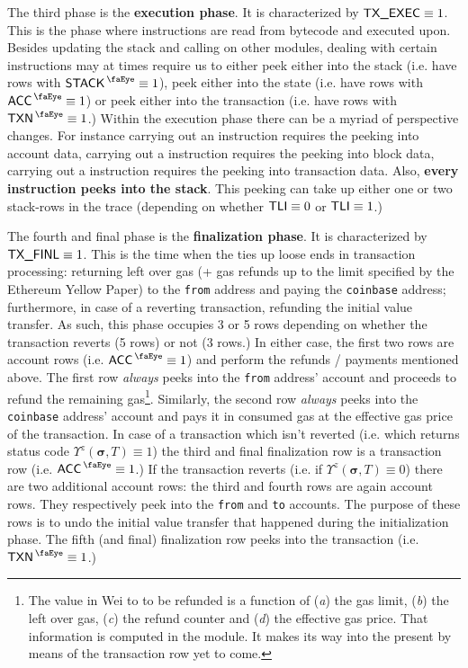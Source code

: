 The third phase is the \textbf{execution phase}.
It is characterized by $\textsf{TX}\textsf{\_EXEC} \equiv 1$. This is the phase where instructions are read from bytecode and executed upon. Besides updating the stack and calling on other modules, dealing with certain instructions may at times require us to either
peek either into the stack       (i.e. have rows with $\peekStack \equiv 1$),
peek either into the state       (i.e. have rows with $\peekAccount \equiv 1$) or
peek either into the transaction (i.e. have rows with $\peekTransaction \equiv 1$.)
Within the execution phase there can be a myriad of perspective changes.
For instance
carrying out an  instruction requires the \zkEvm{} peeking into account data,
carrying out a        instruction requires the \zkEvm{} peeking into block data,
carrying out a        instruction requires the \zkEvm{} peeking into transaction data.
Also, \textbf{every instruction peeks into the stack}.
This peeking can take up either one or two stack-rows in the trace (depending on whether $\textsf{TLI} \equiv 0$ or $\textsf{TLI} \equiv 1$.)

The fourth and final phase is the \textbf{finalization phase}.
It is characterized by $\textsf{TX}\textsf{\_FINL} \equiv 1$. This is the time when the \zkEvm{} ties up loose ends in transaction processing: returning left over gas (+ gas refunds up to the limit specified by the Ethereum Yellow Paper) to the \texttt{from} address and paying the \texttt{coinbase} address; furthermore, in case of a reverting transaction, refunding the initial value transfer. As such, this phase occupies 3 or 5 rows depending on whether the transaction reverts (5 rows) or not (3 rows.) In either case, the first two rows are account rows (i.e. $\peekAccount \equiv 1$) and perform the refunds / payments mentioned above. The first row \emph{always} peeks into the \texttt{from} address' account and proceeds to refund the remaining gas\footnote{The value in Wei to to be refunded is a function of
(\emph{a}) the gas limit,
(\emph{b}) the left over gas,
(\emph{c}) the refund counter and 
(\emph{d}) the effective gas price.
That information is computed in the \txnDataMod{} module. It makes its way into the present \hubMod{} by means of the transaction row yet to come.}. Similarly, the second row \emph{always} peeks into the \texttt{coinbase} address' account and pays it in consumed gas at the effective gas price of the transaction. In case of a transaction which isn't reverted (i.e. which returns status code $\Upsilon^{z}(\bm{\sigma}, T) \equiv 1$) the third and final finalization row is a transaction row (i.e. $\peekAccount \equiv 1$.) If the transaction reverts (i.e. if $\Upsilon^{z}(\bm{\sigma}, T) \equiv 0$) there are two additional account rows: the third and fourth rows are again account rows. They respectively peek into the \texttt{from} and \texttt{to} accounts. The purpose of these rows is to undo the initial value transfer that happened during the initialization phase. The fifth (and final) finalization row peeks into the transaction (i.e. $\peekTransaction \equiv 1$.)

